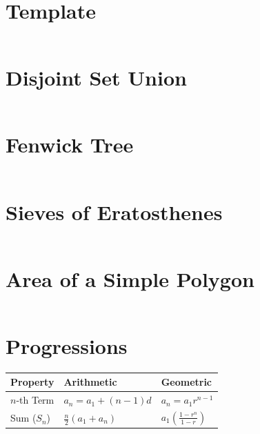\documentclass[10pt,landscape]{article}
\begin{document}
\begin{multicols*}{2}

\section{Template}
\inputminted{cpp}{main.cpp}

\section{Disjoint Set Union}
\inputminted{cpp}{include/dsu.h}
\vfill

\section{Fenwick Tree}
\inputminted{cpp}{include/fenwick_tree.h}

\section{Sieves of Eratosthenes}
\inputminted{cpp}{include/sieves.h}

\section{Area of a Simple Polygon}
\inputminted{cpp}{include/polygon_area.h}

\section{Progressions}
\renewcommand{\arraystretch}{2}
\begin{tabular}{@{} l l l @{}}
\textbf{Property} & \textbf{Arithmetic} & \textbf{Geometric} \\
\hline
$n$-th Term & $a_n = a_1 + (n-1)d$ & $a_n = a_1 r^{n-1}$ \\
Sum ($S_n$) & $\frac{n}{2}(a_1 + a_n)$ & $a_1 (\frac{1-r^n}{1-r})$ \\
\hline
\end{tabular}

\end{multicols*}
\end{document}
